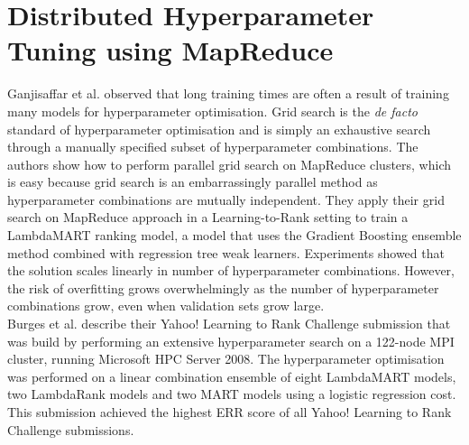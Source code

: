 \section{Distributed Hyperparameter Tuning using MapReduce}
Ganjisaffar et al. \cite{Ganjisaffar2011, Ganjisaffar2011b} observed that long training times are often a result of training many models for hyperparameter optimisation. Grid search is the \emph{de facto} standard of hyperparameter optimisation and is simply an exhaustive search through a manually specified subset of hyperparameter combinations. The authors show how to perform parallel grid search on MapReduce clusters, which is easy because grid search is an embarrassingly parallel method as hyperparameter combinations are mutually independent. They apply their grid search on MapReduce approach in a Learning-to-Rank setting to train a LambdaMART \cite{Wu2008} ranking model, a model that uses the Gradient Boosting \cite{Friedman2002} ensemble method combined with regression tree weak learners. Experiments showed that the solution scales linearly in number of hyperparameter combinations. However, the risk of overfitting grows overwhelmingly as the number of hyperparameter combinations grow, even when validation sets grow large.\\

Burges et al. \cite{Burges2011} describe their Yahoo! Learning to Rank Challenge submission that was build by performing an extensive hyperparameter search on a 122-node MPI cluster, running Microsoft HPC Server 2008. The hyperparameter optimisation was performed on a linear combination ensemble of eight LambdaMART models, two LambdaRank models and two MART models using a logistic regression cost. This submission achieved the highest \ac{ERR} score of all Yahoo! Learning to Rank Challenge submissions.
